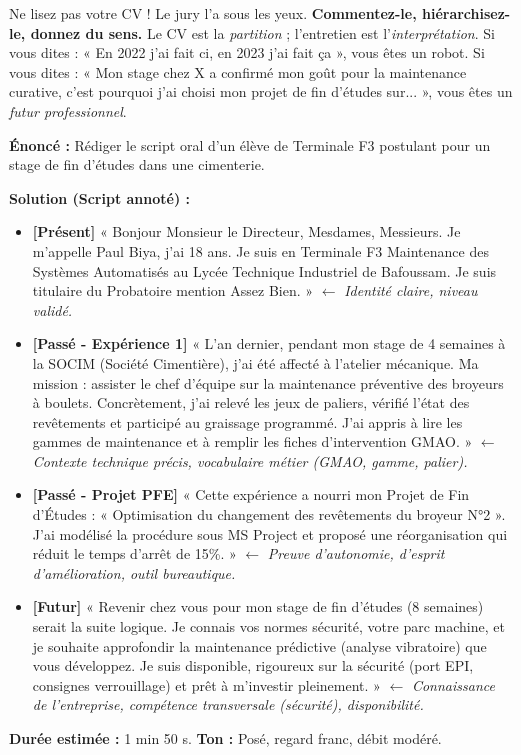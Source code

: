 \documentclass[11pt]{article}
\begin{document}
\begin{attention}
Ne lisez pas votre CV ! Le jury l'a sous les yeux. \textbf{Commentez-le, hiérarchisez-le, donnez du sens.} Le CV est la \emph{partition} ; l'entretien est l'\emph{interprétation}. Si vous dites : « En 2022 j'ai fait ci, en 2023 j'ai fait ça », vous êtes un robot. Si vous dites : « Mon stage chez X a confirmé mon goût pour la maintenance curative, c'est pourquoi j'ai choisi mon projet de fin d'études sur... », vous êtes un \emph{futur professionnel}.
\end{attention}

\begin{exoresolu}
\textbf{Énoncé :} Rédiger le script oral d'un élève de Terminale F3 postulant pour un stage de fin d'études dans une cimenterie.

\tcblower
\textbf{Solution (Script annoté) :}
\begin{itemize}
    \item \textbf{[Présent]} « Bonjour Monsieur le Directeur, Mesdames, Messieurs. Je m'appelle Paul Biya, j'ai 18 ans. Je suis en Terminale F3 Maintenance des Systèmes Automatisés au Lycée Technique Industriel de Bafoussam. Je suis titulaire du Probatoire mention Assez Bien. » $\leftarrow$ \textit{Identité claire, niveau validé.}
    \item \textbf{[Passé - Expérience 1]} « L'an dernier, pendant mon stage de 4 semaines à la SOCIM (Société Cimentière), j'ai été affecté à l'atelier mécanique. Ma mission : assister le chef d'équipe sur la maintenance préventive des broyeurs à boulets. Concrètement, j'ai relevé les jeux de paliers, vérifié l'état des revêtements et participé au graissage programmé. J'ai appris à lire les gammes de maintenance et à remplir les fiches d'intervention GMAO. » $\leftarrow$ \textit{Contexte technique précis, vocabulaire métier (GMAO, gamme, palier).}
    \item \textbf{[Passé - Projet PFE]} « Cette expérience a nourri mon Projet de Fin d'Études : « Optimisation du changement des revêtements du broyeur N°2 ». J'ai modélisé la procédure sous MS Project et proposé une réorganisation qui réduit le temps d'arrêt de 15\%. » $\leftarrow$ \textit{Preuve d'autonomie, d'esprit d'amélioration, outil bureautique.}
    \item \textbf{[Futur]} « Revenir chez vous pour mon stage de fin d'études (8 semaines) serait la suite logique. Je connais vos normes sécurité, votre parc machine, et je souhaite approfondir la maintenance prédictive (analyse vibratoire) que vous développez. Je suis disponible, rigoureux sur la sécurité (port EPI, consignes verrouillage) et prêt à m'investir pleinement. » $\leftarrow$ \textit{Connaissance de l'entreprise, compétence transversale (sécurité), disponibilité.}
\end{itemize}
\textbf{Durée estimée :} 1 min 50 s. \textbf{Ton :} Posé, regard franc, débit modéré.
\end{exoresolu}
\end{document}
